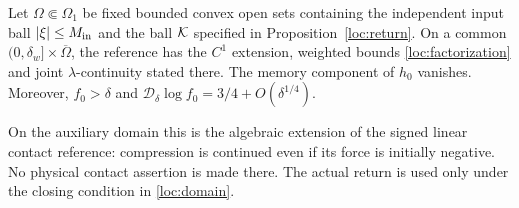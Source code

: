 \begin{proposition}
\label{prop:limiting-factorization}
Let $\Omega\Subset\Omega_1$ be fixed bounded convex open sets containing
the independent input ball $|\xi|\le M_{\rm in}$ and the ball $\mathcal K$
specified in Proposition~\ref{loc:return}.
On a common $(0,\delta_w]\times\overline\Omega$, the reference has
the $C^1$ extension, weighted bounds \eqref{loc:factorization} and joint
$\lambda$-continuity stated there. The memory component of $h_0$
vanishes. Moreover,
$f_0>\delta$ and
$\mathscr D_\delta\log f_0=3/4+O(\delta^{1/4})$.
\end{proposition}
On the auxiliary domain this is the algebraic extension of the signed
linear contact reference: compression is continued even if its force
is initially negative. No physical contact assertion is made there.
The actual return is used only under the closing condition in
\eqref{loc:domain}.
